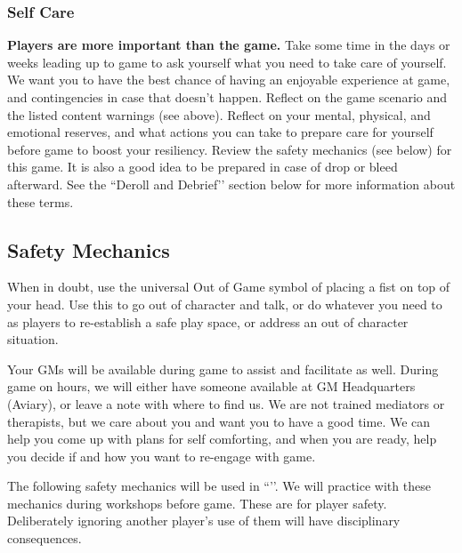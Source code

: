 \documentclass[sheet]{GL2020}
\begin{document}
\subsubsection{Self Care}
\textbf{Players are more important than the game.} Take some time in the days or weeks leading up to game to ask yourself what you need to take care of yourself. We want you to have the best chance of having an enjoyable experience at game, and contingencies in case that doesn’t happen. Reflect on the game scenario and the listed content warnings (see above). Reflect on your mental, physical, and emotional reserves, and what actions you can take to prepare care for yourself before game to boost your resiliency. Review the safety mechanics (see below) for this game. It is also a good idea to be prepared in case of drop or bleed afterward. See the ``Deroll and Debrief’’ section below for more information about these terms.

\subsection{Safety Mechanics}
When in doubt, use the universal Out of Game symbol of placing a fist on top of your head. Use this to go out of character and talk, or do whatever you need to as players to re-establish a safe play space, or address an out of character situation. 

Your GMs will be available during game to assist and facilitate as well. During game on hours, we will either have someone available at GM Headquarters (Aviary), or leave a note with where to find us. We are not trained mediators or therapists, but we care about you and want you to have a good time. We can help you come up with plans for self comforting, and when you are ready, help you decide if and how you want to re-engage with game.

The following safety mechanics will be used in ``\gamename{}’’. We will practice with these mechanics during workshops before game. These are for player safety. Deliberately ignoring another player’s use of them will have disciplinary consequences.
\end{document}
